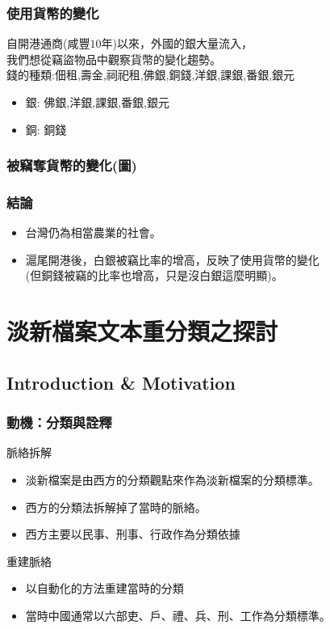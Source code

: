 \documentclass{beamer}
\begin{document}
\begin{frame}
    \frametitle{使用貨幣的變化}
    自開港通商(咸豐$10$年)以來，外國的銀大量流入，\\我們想從竊盜物品中觀察貨幣的變化趨勢。\\
    錢的種類:佃租,壽金,祠祀租,佛銀,銅錢,洋銀,課銀,番銀,銀元
    \begin{itemize}
        \item 銀: 佛銀,洋銀,課銀,番銀,銀元
        \item 銅: 銅錢
    \end{itemize}
\end{frame}
\begin{frame}
    \frametitle{被竊奪貨幣的變化(圖)}
\end{frame}

\begin{frame}
\frametitle{結論}
\begin{itemize}
    \item 台灣仍為相當農業的社會。
    \item 滬尾開港後，白銀被竊比率的增高，反映了使用貨幣的變化\\(但銅錢被竊的比率也增高，只是沒白銀這麼明顯)。
\end{itemize}
\end{frame}

\section{淡新檔案文本重分類之探討}
\subsection{Introduction \& Motivation}
\begin{frame}
	\frametitle{動機：分類與詮釋}
	脈絡拆解
	\begin{itemize}
	\item 淡新檔案是由西方的分類觀點來作為淡新檔案的分類標準。
	\item 西方的分類法拆解掉了當時的脈絡。
	\item 西方主要以民事、刑事、行政作為分類依據
	\end{itemize}
	重建脈絡
	\begin{itemize}
	\item 以自動化的方法重建當時的分類
	\item 當時中國通常以六部吏、戶、禮、兵、刑、工作為分類標準。
	\end{itemize}
\end{frame}
\end{document}
